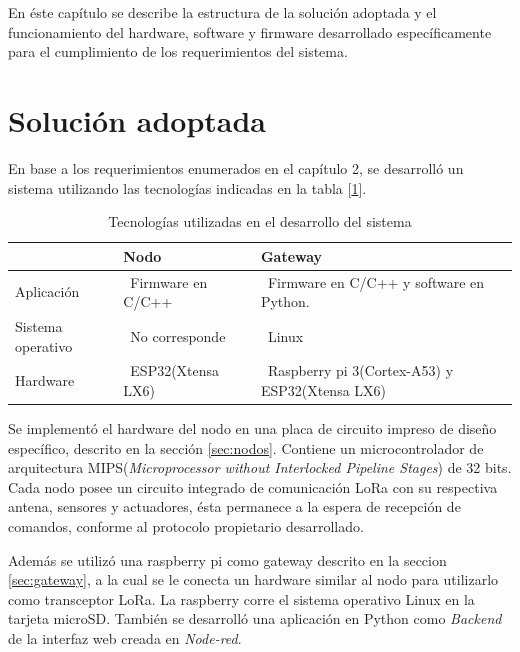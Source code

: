 En éste capítulo se describe la estructura de la solución adoptada y el funcionamiento del hardware, software y firmware desarrollado específicamente para el cumplimiento de los requerimientos del sistema.

\section{Solución adoptada}

En base a los requerimientos enumerados en el capítulo 2, se desarrolló un sistema utilizando las tecnologías indicadas en la tabla [\ref{tab:solucionadoptada}].

\begin{table}[h]
	\centering
	\caption[Solución adoptada]{Tecnologías utilizadas en el desarrollo del sistema}
	\begin{tabular}{l m{4.5cm} m{4.5cm}}    
		\toprule
		\textbf{}  					& \textbf{Nodo}     				& \textbf{Gateway}	\\
		\midrule
		Aplicación 					& \ Firmware en C/C++				& \ Firmware en C/C++ y software en Python. \\
		Sistema operativo	 		& \ No corresponde 					& \ Linux\\
		Hardware		 			& \ ESP32(Xtensa LX6) 				& \ Raspberry pi 3(Cortex-A53) y ESP32(Xtensa LX6)\\
		\bottomrule
		\hline
	\end{tabular}
	\label{tab:solucionadoptada}
\end{table}

Se implementó el hardware del nodo en una placa de circuito impreso de diseño específico, descrito en la sección \ref{sec:nodos}. Contiene un microcontrolador de arquitectura MIPS({\textit{Microprocessor without Interlocked Pipeline Stages}}) de 32 bits. Cada nodo posee un circuito integrado de comunicación LoRa con su respectiva antena, sensores y actuadores, ésta permanece a la espera de recepción de comandos, conforme al protocolo propietario desarrollado.

Además se utilizó una raspberry pi como gateway descrito en la seccion \ref{sec:gateway}, a la cual se le conecta un hardware similar al nodo para utilizarlo como transceptor LoRa. La raspberry corre el sistema operativo Linux en la tarjeta microSD. También se desarrolló una aplicación en Python como {\textit{Backend}} de la interfaz web creada en {\textit{Node-red}}.


